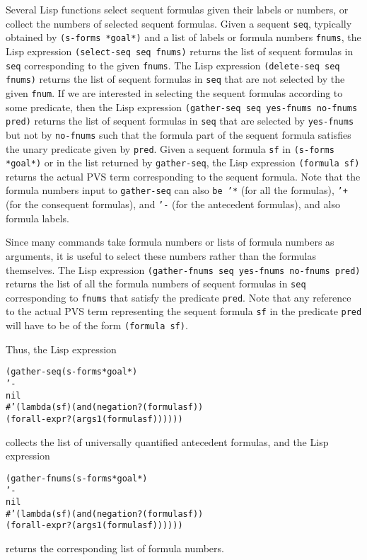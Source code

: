\documentclass[12pt,twoside]{book}
\begin{document}
 Several Lisp functions  select sequent formulas
given their labels or numbers, or collect the numbers 
of selected sequent formulas.  Given a sequent \texttt{seq}, typically obtained
by \texttt{(s-forms *goal*)} and a list of labels or formula
numbers \texttt{fnums},  the Lisp expression \texttt{(select-seq seq fnums)}
returns the list of sequent formulas in \texttt{seq} corresponding to the
given \texttt{fnums}\@.  The Lisp expression \texttt{(delete-seq seq fnums)}
returns the list of sequent formulas in \texttt{seq} that are not
selected by the given \texttt{fnum}\@.  If we are interested in
selecting the sequent formulas according to some predicate, then
the Lisp expression \texttt{(gather-seq seq yes-fnums no-fnums pred)}
returns the list of sequent formulas in \texttt{seq} that are selected
by \texttt{yes-fnums} but not by \texttt{no-fnums} such that the formula part
of the sequent formula satisfies the unary predicate given by \texttt{pred}\@.  Given a sequent formula \texttt{sf} in \texttt{(s-forms *goal*)} or in the list returned by \texttt{gather-seq}, the Lisp expression
\texttt{(formula sf)} returns the actual PVS term corresponding to the
sequent formula.  Note that the formula numbers input to \texttt{gather-seq}
can also \texttt{be '*} (for all the formulas), \texttt{'+} (for the
consequent formulas), and \texttt{'-} (for the antecedent formulas),
and also formula labels. 

Since many commands take  formula numbers or lists of formula numbers as
arguments, it is useful to select these numbers rather than the formulas
themselves.  The Lisp expression \texttt{(gather-fnums seq yes-fnums no-fnums
pred)} returns the list of all the formula numbers of sequent formulas in
\texttt{seq} corresponding to \texttt{fnums} that satisfy the predicate \texttt{pred}\@.  Note that any reference to the actual PVS term representing
the sequent formula \texttt{sf} in the predicate \texttt{pred} will have to be
of the form \texttt{(formula sf)}\@.  


Thus, the Lisp expression
\begin{alltt}
  (gather-seq (s-forms *goal*)
              '-
              nil
              \#'(lambda (sf) (and (negation? (formula sf))
                               (forall-expr? (args1 (formula sf))))))
\end{alltt}
collects the list of universally quantified
antecedent formulas, and the Lisp expression
\begin{alltt}
  (gather-fnums (s-forms *goal*)
                '-
                nil
              \#'(lambda (sf) (and (negation? (formula sf))
                               (forall-expr? (args1 (formula sf))))))
\end{alltt}
returns the corresponding list of formula numbers.
\end{document}
